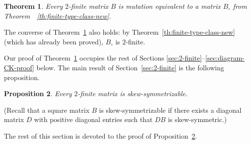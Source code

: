 \documentclass[letterpaper]{amsart}
\numberwithin{equation}{section}
\newtheorem{theorem}{Theorem}[section]
\newtheorem{proposition}[theorem]{Proposition}
\theoremstyle{definition}
\newtheorem{remark}[theorem]{Remark}
\begin{document}
\begin{theorem} 
\label{th:2-fin-CK} 
Every $2$-finite matrix $B$ is mutation equivalent to a matrix $B_\circ$ 
from Theorem~~\ref{th:finite-type-class-new}. 
\end{theorem} 
 
 
The converse of Theorem~\ref{th:2-fin-CK} also holds: 
by Theorem~\ref{th:finite-type-class-new} 
(which has already been proved), $B_\circ$ 
is $2$-finite. 
 
Our proof of Theorem~\ref{th:2-fin-CK} occupies the rest of Sections 
\ref{sec:2-finite}--\ref{sec:diagram-CK-proof} below. 
The main result of Section~\ref{sec:2-finite} is the following proposition. 
 
\begin{proposition} 
\label{pr:2-finite-is-ss} 
Every $2$-finite matrix is skew-symmetrizable. 
\end{proposition} 
 
(Recall that a square matrix $B$ is skew-symmetrizable if there exists 
a diagonal matrix $D$ with positive diagonal entries such that $DB$ is 
skew-symmetric.) 
 
The rest of this section is devoted to the proof of 
Proposition~\ref{pr:2-finite-is-ss}. 
 
\end{document}

